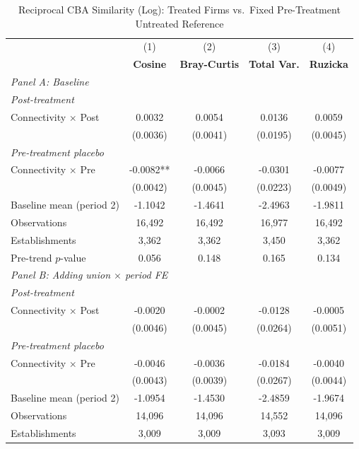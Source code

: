 \begin{table}[H]
\centering
\caption{Reciprocal CBA Similarity (Log): Treated Firms vs.\ Fixed Pre-Treatment Untreated Reference}
\label{tab:treated_pretreat_ref_ln_cba_similarity}
\scriptsize
\setlength{\tabcolsep}{8pt}
\begin{tabular}{lcccc}
\toprule\toprule
 & (1) & (2) & (3) & (4) \\
 & \textbf{Cosine} & \textbf{Bray-Curtis} & \textbf{Total Var.} & \textbf{Ruzicka} \\
\midrule
\multicolumn{5}{l}{\textit{Panel A: Baseline}} \\
\multicolumn{5}{l}{\textit{Post-treatment}} \\
Connectivity $\times$ Post & 0.0032 & 0.0054 & 0.0136 & 0.0059 \\
 & (0.0036) & (0.0041) & (0.0195) & (0.0045) \\
\multicolumn{5}{l}{\textit{Pre-treatment placebo}} \\
Connectivity $\times$ Pre & -0.0082** & -0.0066 & -0.0301 & -0.0077 \\
 & (0.0042) & (0.0045) & (0.0223) & (0.0049) \\
\midrule
Baseline mean (period 2) & -1.1042 & -1.4641 & -2.4963 & -1.9811 \\
Observations &       16,492 &       16,492 &       16,977 &       16,492 \\
Establishments &        3,362 &        3,362 &        3,450 &        3,362 \\
Pre-trend $p$-value & 0.056 & 0.148 & 0.165 & 0.134 \\
\midrule
\multicolumn{5}{l}{\textit{Panel B: Adding union $\times$ period FE}} \\
\multicolumn{5}{l}{\textit{Post-treatment}} \\
Connectivity $\times$ Post & -0.0020 & -0.0002 & -0.0128 & -0.0005 \\
 & (0.0046) & (0.0045) & (0.0264) & (0.0051) \\
\multicolumn{5}{l}{\textit{Pre-treatment placebo}} \\
Connectivity $\times$ Pre & -0.0046 & -0.0036 & -0.0184 & -0.0040 \\
 & (0.0043) & (0.0039) & (0.0267) & (0.0044) \\
\midrule
Baseline mean (period 2) & -1.0954 & -1.4530 & -2.4859 & -1.9674 \\
Observations &       14,096 &       14,096 &       14,552 &       14,096 \\
Establishments &        3,009 &        3,009 &        3,093 &        3,009 \\

\end{tabular}
\end{table}
